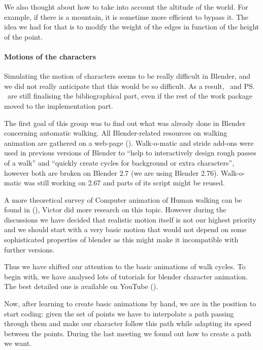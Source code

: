 We also thought about how to take into account the altitude of the world. For example, if there is a mountain, it is sometime more efficient to bypass it. The idea we had for that is to modify the weight of the edges in function of the height of the point. 

\paragraph{Motions of the characters}
\label{WP2_motion}
Simulating the motion of characters seems to be really difficult in Blender, and we did not really anticipate that this would be so difficult. As a result, \vl\ and \ps\ are still finalising the bibliographical part, even if the rest of the work package moved to the implementation part.


\par The first goal of this group was to find out what was already done in Blender concerning automatic walking. All Blender-related resources on walking animation are gathered on a web-page (\cite{blwikiwalking}). Walk-o-matic and stride add-ons were used in previous versions of Blender to ``help to interactively design rough passes of a walk'' and ``quickly create cycles for background or extra characters'', however both are broken on Blender 2.7 (we are using Blender 2.76). Walk-o-matic was still working on 2.67 and parts of its script might be reused.

\par A more theoretical survey of Computer animation of Human walking can be found in (\cite{th_walking}), Victor did more research on this topic. However during the discussions we have decided that realistic motion itself is not our highest priority and we should start with a very basic motion that would not depend on some sophisticated properties of blender as this might make it incompatible with further versions.

\par Thus we have shifted our attention to the basic animations of walk cycles. To begin with, we have analysed lots of tutorials for blender character animation. The best detailed one is available on YouTube (\cite{tuto_walk}).


\par Now, after learning to create basic animations by hand, we are in the position to start coding: given the set of points we have to interpolate a path passing through them and make our character follow this path while adapting its speed between the points. During the last meeting we found out how to create a path we want.

